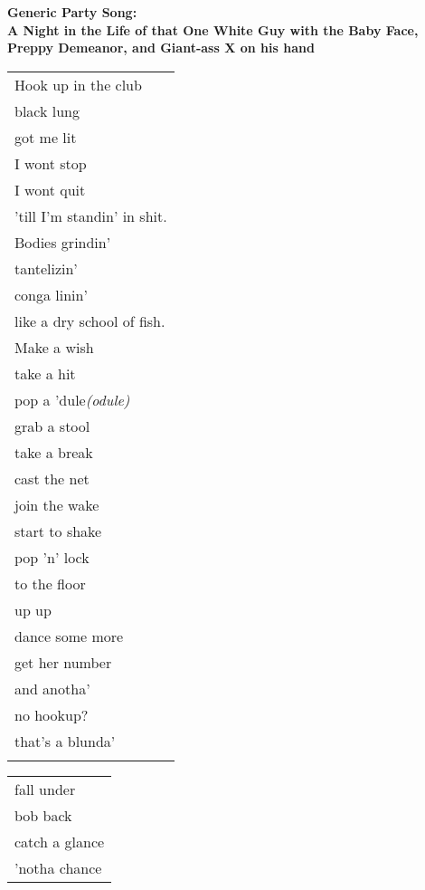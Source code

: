 \documentclass{article}
\begin{document}
\newcommand{\h}{\hspace{3ex}}
\newcommand{\hoar}{%
\begin{center}
\line(1,0){350}
\end{center}
}

\begin{center}
\textbf{Generic Party Song:} \\
\textbf{A Night in the Life of that One White Guy with the Baby Face,} \\
\textbf{Preppy Demeanor, and Giant-ass X on his hand} \\
\vspace*{1ex}
\begin{tabular}{l}
Hook up in the club \\
black lung \\
got me lit \\
I wont stop \\
I wont quit \\
'till I'm standin' in shit. \\
Bodies grindin' \\
tantelizin' \\
conga linin' \\
like a dry school of fish. \\
Make a wish \\
take a hit \\
pop a 'dule\hspace{3ex}\textit{(odule)} \\
grab a stool \\
take a break \\
cast the net \\
join the wake \\
start to shake \\
pop 'n' lock \\
to the floor \\
up up \\
dance some more \\
get her number \\
and anotha' \\
no hookup? \\
that's a blunda' \\
\\
\end{tabular}
\begin{tabular}{l}
fall under \\
bob back \\
catch a glance \\
'notha chance \\

\end{tabular}
\end{center}
\end{document}
